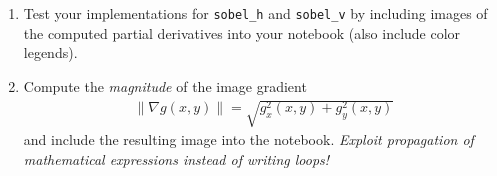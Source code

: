 \documentclass[12pt,a4paper]{article}
\begin{document}
\begin{samepage}
\begin{enumerate}
\begin{figure}[h!]
        \label{fig:sobel}
    \end{figure}
    \item Test your implementations for \texttt{sobel\_h} and \texttt{sobel\_v} by including images of the computed partial derivatives into your notebook (also include color legends).
    \item Compute the \emph{magnitude} of the image gradient \begin{gather*}\left\|\nabla g\left(x,y\right)\right\| = \sqrt{g_x^2\left(x,y\right) + g_y^2\left(x,y\right)}\end{gather*} and include the resulting image into the notebook. \emph{Exploit propagation of mathematical expressions instead of writing loops!}
\end{enumerate}
\end{samepage}
\end{document}
